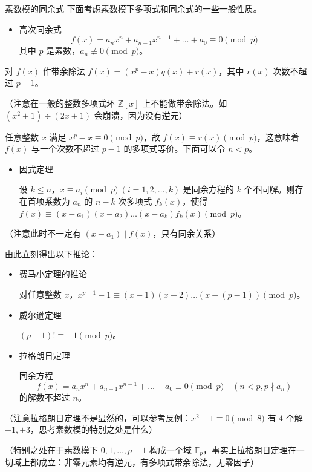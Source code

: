 \documentclass [hyperref={bookmarksdepth=4}, aspectratio=169] {beamer}
\theoremstyle {fy}
\def\Z{\mathbb{Z}}
\begin{document}
\begin{frame}{素数模的同余式}
下面考虑素数模下多项式和同余式的一些一般性质。

\begin{itemize}
    \item 高次同余式
  $$
  f(x)=a_nx^n+a_{n-1}x^{n-1}+\dots+a_0\equiv 0\pmod p
  $$
  其中 $p$ 是素数，$a_{n}\not\equiv 0\pmod p$。
\end{itemize}

对 $f(x)$ 作带余除法 $f(x)=(x^p-x)q(x)+r(x)$，其中 $r(x)$ 次数不超过 $p-1$。

（注意在一般的整数多项式环 $\Z[x]$ 上不能做带余除法。如 $(x^2+1)\div(2x+1)$ 会崩溃，因为没有逆元）

任意整数 $x$ 满足 $x^p-x\equiv 0\pmod p$，故 $f(x)\equiv r(x)\pmod p$，这意味着 $f(x)$ 与一个次数不超过 $p-1$ 的多项式等价。下面可以令 $n<p$。

\begin{itemize}
    \item 因式定理

  设 $k\le n$，$x\equiv a_i\pmod p \ (i=1,2,\dots,k)$ 是同余方程的 $k$ 个不同解。则存在首项系数为 $a_n$ 的 $n-k$ 次多项式 $f_k(x)$，使得 $f(x)\equiv (x-a_1)(x-a_2)\dots(x-a_k)f_k(x)\pmod p$。
\end{itemize}

（注意此时不一定有 $(x-a_1)\mid f(x)$，只有同余关系）

由此立刻得出以下推论：

\begin{itemize}
    \item 费马小定理的推论

  对任意整数 $x$，$x^{p-1}-1\equiv (x-1)(x-2)\dots(x-(p-1))\pmod p$。

    \item 威尔逊定理

  $(p-1)!\equiv -1\pmod p$。

    \item 拉格朗日定理

  同余方程
  $$
  f(x)=a_nx^n+a_{n-1}x^{n-1}+\dots+a_0\equiv 0\pmod p\quad(n<p,p\nmid a_n)
  $$
  的解数不超过 $n$。
\end{itemize}

（注意拉格朗日定理不是显然的，可以参考反例：$x^2-1\equiv 0\pmod 8$ 有 $4$ 个解 $\pm 1,\pm 3$，思考素数模的特别之处是什么）

（特别之处在于素数模下 $0,1,\dots,p-1$ 构成一个域 $\mathbb{F}_p$，事实上拉格朗日定理在一切域上都成立：非零元素均有逆元，有多项式带余除法，无零因子）
\end{frame}
\end{document}
